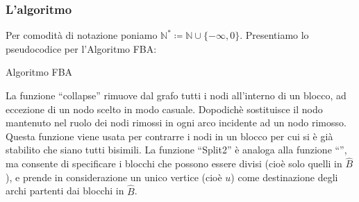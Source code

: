 \subsubsection{L'algoritmo}
Per comodità di notazione poniamo $\mathbb{N}^* \coloneqq \mathbb{N} \cup \{-\infty, 0\}$. Presentiamo lo pseudocodice per l'Algoritmo FBA:\\
\begin{algorithm}[H]
    \label{alg:fba}
    \caption{Algoritmo FBA}
     {
    }
\end{algorithm}

La funzione ``collapse'' rimuove dal grafo tutti i nodi all'interno di un blocco, ad eccezione di un nodo scelto in modo casuale. Dopodichè sostituisce il nodo mantenuto nel ruolo dei nodi rimossi in ogni arco incidente ad un nodo rimosso. Questa funzione viene usata per contrarre i nodi in un blocco per cui si è già stabilito che siano tutti bisimili. La funzione ``Split2'' è analoga alla funzione ``\splitfunc'', ma consente di specificare i blocchi che possono essere divisi (cioè solo quelli in $\widehat{B}$), e prende in considerazione un unico vertice (cioè $u$) come destinazione degli archi partenti dai blocchi in $\widehat{B}$.

